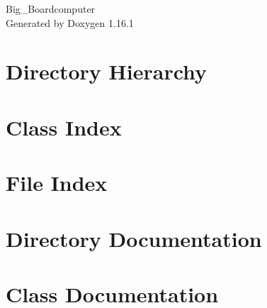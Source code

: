 \documentclass[twoside]{book}
\newcommand{\+}{\discretionary{\mbox{\scriptsize$\hookleftarrow$}}{}{}}
\newcommand{\clearemptydoublepage}{%
    \newpage{\pagestyle{empty}\cleardoublepage}%
  }
\begin{document}
  \raggedbottom
    \hypersetup{pageanchor=false,
                bookmarksnumbered=true,
                pdfencoding=unicode
               }
  \begin{titlepage}
  \vspace*{7cm}
  \begin{center}%
  {\Large Big\+\_\+\+Boardcomputer}\\
  \vspace*{1cm}
  {\large Generated by Doxygen 1.16.1}\\
  \end{center}
  \end{titlepage}
  \clearemptydoublepage
  \tableofcontents
  \clearemptydoublepage
  \hypersetup{pageanchor=true}

\chapter{Directory Hierarchy}

\chapter{Class Index}

\chapter{File Index}

\chapter{Directory Documentation}





\chapter{Class Documentation}






\end{document}
